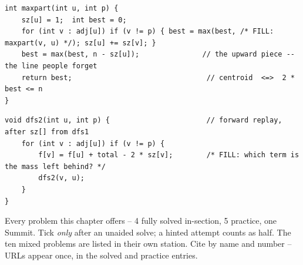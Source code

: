 \begin{lstlisting}[caption={Drill 4 -- centroid maxpart (from \coderef{c09-cent})}]
int maxpart(int u, int p) {
    sz[u] = 1;  int best = 0;
    for (int v : adj[u]) if (v != p) { best = max(best, /* FILL: maxpart(v, u) */); sz[u] += sz[v]; }
    best = max(best, n - sz[u]);               // the upward piece -- the line people forget
    return best;                                // centroid  <=>  2 * best <= n
}
\end{lstlisting}

\begin{lstlisting}[caption={Drill 5 -- the reroot shift for sum-of-distances (from \coderef{c09-summit})}]
void dfs2(int u, int p) {                       // forward replay, after sz[] from dfs1
    for (int v : adj[u]) if (v != p) {
        f[v] = f[u] + total - 2 * sz[v];        /* FILL: which term is the mass left behind? */
        dfs2(v, u);
    }
}
\end{lstlisting}


Every problem this chapter offers -- 4 fully solved in-section, 5 practice, one Summit. Tick
\emph{only} after an unaided solve; a hinted attempt counts as half. The ten mixed problems
are listed in their own station. Cite by name and number -- URLs appear once, in the solved
and practice entries.

